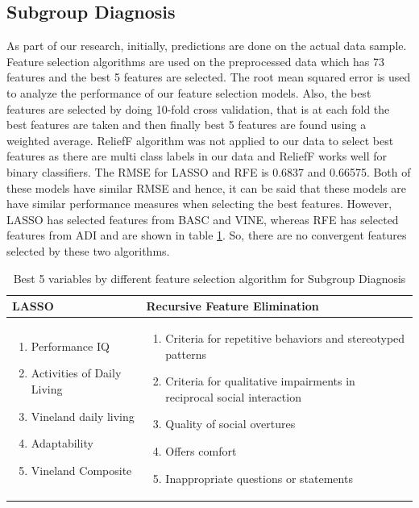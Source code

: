 \subsection{Subgroup Diagnosis}
As part of our research, initially, predictions are done on the actual data sample. Feature selection algorithms are used on the preprocessed data which has 73 features and the best 5 features are selected. The root mean squared error  is used to analyze the performance of our feature selection models. Also, the best features are selected by doing 10-fold cross validation, that is at each fold the best features are taken and then finally best 5 features are found using a weighted average. ReliefF algorithm was not applied to our data to select best features as there are multi class labels in our data and ReliefF works well for binary classifiers. The RMSE for LASSO and RFE is 0.6837 and 0.66575. Both of these models have similar RMSE and hence, it can be said that these models are have similar performance measures when selecting the best features. However, LASSO has selected features from BASC and VINE, whereas RFE has selected features from ADI and are shown in table \ref{table:Subgroup}. So, there are no convergent features selected by these two algorithms.
\begin{table}[h]
\begin{center}
\begin{tabular}{|p{7 cm}|p{8 cm}|}
\hline
\textbf{LASSO} & \textbf{Recursive Feature Elimination}\\
\hline \hline
\begin{enumerate}
\item Performance IQ
\item Activities of Daily Living
\item Vineland daily living
\item Adaptability
\item Vineland Composite 
\end{enumerate}  & \begin{enumerate}
\item Criteria for repetitive behaviors and stereotyped patterns
\item Criteria for qualitative impairments in reciprocal social interaction
\item Quality of social overtures
\item Offers comfort
\item Inappropriate questions or statements
\end{enumerate} \\
\hline
\end{tabular}
\end{center}
\caption{Best 5 variables by different feature selection algorithm for Subgroup Diagnosis}
\label{table:Subgroup}
\end{table}

